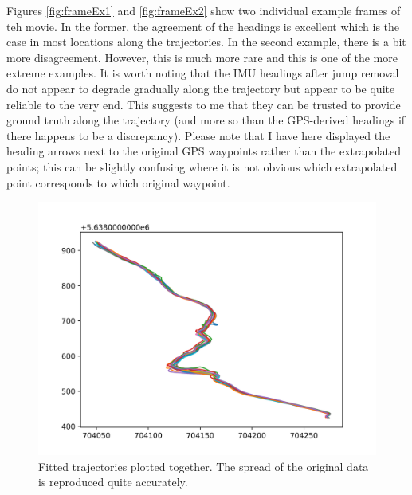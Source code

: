 \documentclass[a4]{article}
\begin{document}
Figures \ref{fig:frameEx1} and \ref{fig:frameEx2} show two individual
example frames of teh movie. In the former, the agreement of the headings is
excellent which is the case in most locations along the
trajectories. In the second example, there is a bit more
disagreement. However, this is much more rare and this is one of the
more extreme examples. It is worth noting that the IMU headings
after jump removal do not appear to degrade gradually along the
trajectory but appear to be quite reliable to the very end. This
suggests to me that they can be trusted to provide ground truth
along the trajectory (and more so than the GPS-derived headings
if there happens to be a discrepancy). Please note that I have here
displayed the heading arrows next to the original GPS waypoints
rather than the extrapolated points; this can be slightly confusing
where it is not obvious which extrapolated point corresponds to
which original waypoint.

\begin{figure}
  \includegraphics[width=\textwidth]{figures/fitted_trajectories_onepanel.png}
  \caption{\label{fig:fittedTraj1} Fitted trajectories plotted
    together. The spread of the original data is reproduced quite
    accurately.
    }
\end{figure}
\end{document}
